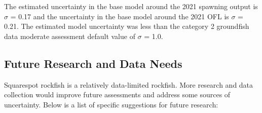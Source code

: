 \documentclass[11pt,
  english,
  a4paper,
]{article}
\begin{document}
\leavevmode\tagmcend\tagstructend


The estimated uncertainty in the base model around the 2021 spawning output is {\(\sigma\)\leavevmode\tagmcend\tagstructend} = 0.17 and the uncertainty in the base model around the 2021 OFL is {\(\sigma\)\leavevmode\tagmcend\tagstructend} = 0.21. The estimated model uncertainty was less than the category 2 groundfish data moderate assessment default value of {\(\sigma\)\leavevmode\tagmcend\tagstructend} = 1.0.

\leavevmode\tagmcend\tagstructend\par


\hypertarget{future-research-and-data-needs}{%
\subsection{Future Research and Data Needs}\label{future-research-and-data-needs}}

\leavevmode\tagmcend\tagstructend


Squarespot rockfish is a relatively data-limited rockfish. More research and data collection would improve future assessments and address some sources of uncertainty. Below is a list of specific suggestions for future research:

\leavevmode\tagmcend\tagstructend\par

\end{document}
